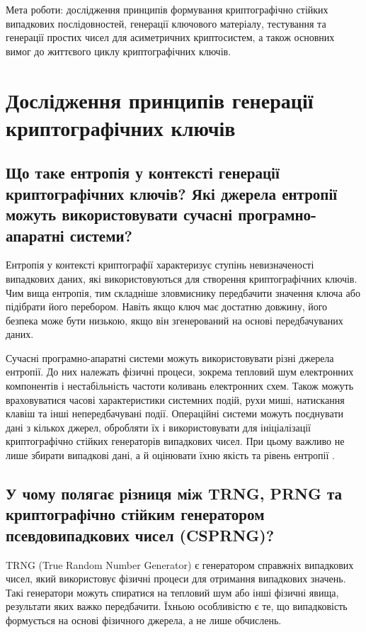 Мета роботи: дослідження принципів формування криптографічно стійких випадкових 
послідовностей, генерації ключового матеріалу, тестування та генерації простих чисел 
для асиметричних криптосистем, а також основних вимог до життєвого циклу 
криптографічних ключів. 

\section{Дослідження принципів генерації криптографічних ключів}

\subsection{Що таке ентропія у контексті генерації криптографічних ключів? Які джерела ентропії можуть використовувати сучасні програмно-апаратні системи?}

Ентропія у контексті криптографії характеризує ступінь невизначеності випадкових даних, які використовуються для створення криптографічних ключів. 
Чим вища ентропія, тим складніше зловмиснику передбачити значення ключа або підібрати його перебором. Навіть якщо ключ має достатню довжину, його безпека може бути низькою, 
якщо він згенерований на основі передбачуваних даних.

Сучасні програмно-апаратні системи можуть використовувати різні джерела ентропії. До них належать фізичні процеси, зокрема тепловий шум електронних компонентів 
і нестабільність частоти коливань електронних схем. Також можуть враховуватися часові характеристики системних подій, рухи миші, натискання клавіш та інші непередбачувані події. 
Операційні системи можуть поєднувати дані з кількох джерел, обробляти їх і використовувати для ініціалізації криптографічно стійких генераторів випадкових чисел. 
При цьому важливо не лише збирати випадкові дані, а й оцінювати їхню якість та рівень ентропії \cite{RFC4086,NIST80090B}.

\subsection{У чому полягає різниця між TRNG, PRNG та криптографічно стійким генератором псевдовипадкових чисел (CSPRNG)?}

TRNG (True Random Number Generator) є генератором справжніх випадкових чисел, який використовує фізичні процеси для отримання випадкових значень. 
Такі генератори можуть спиратися на тепловий шум або інші фізичні явища, результати яких важко передбачити. Їхньою особливістю є те, що випадковість формується 
на основі фізичного джерела, а не лише обчислень.

